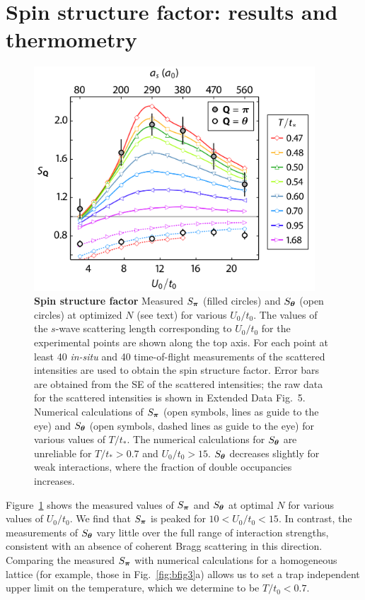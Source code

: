\BraggFigureNum 

\section{Spin structure factor: results and thermometry}
 
\begin{figure}
\centering \includegraphics[width=105mm]{../figures/afmpaper/Hulet_fig4.png}
\caption{\textbf{Spin structure factor}  Measured $S_{\bm{\pi}}$ (filled
circles) and $S_{\bm{\theta}}$ (open circles) at optimized $N$ (see text) for
various $U_{0}/t_{0}$. The values of the $s$-wave scattering length
corresponding to $U_{0}/t_{0}$ for the experimental points are shown along the
top axis.  For each point at least 40 \textit{in-situ} and 40 time-of-flight
measurements of the scattered intensities are used to obtain the spin structure
factor.  Error bars are obtained from the SE of the scattered intensities; the
raw data for the scattered intensities is shown in Extended Data Fig.~5.
Numerical calculations of $S_{\bm{\pi}}$ (open symbols, lines as guide to the
eye) and $S_{\bm{\theta}}$ (open symbols, dashed lines as guide to the eye) for
various values of $T/t_{*}$. The numerical calculations for $S_{\bm{\theta}}$
are unreliable for $T/t_{*}>0.7$ and $U_{0}/t_{0}>15$.  $S_{\bm{\theta}}$
decreases slightly for weak interactions, where the fraction of double
occupancies increases.  }
\label{fig:bfig4} 
\end{figure}

Figure~\ref{fig:bfig4} shows the measured values of $S_{\bm{\pi}}$ and
$S_{\bm{\theta}}$ at optimal $N$ for various values of $U_{0}/t_{0}$.  We find
that $S_{\bm{\pi}}$ is peaked for $10 < U_{0}/t_{0} < 15$.  In contrast, the
measurements of $S_{\bm{\theta}}$ vary little over the full range of
interaction strengths, consistent with an absence of coherent Bragg scattering
in this direction.  Comparing the measured $S_{\bm{\pi}}$ with numerical
calculations for a homogeneous lattice (for example, those in
Fig.~\ref{fig:bfig3}a) allows us to set a trap independent upper limit on the
temperature, which we determine to be $T/t_{0}<0.7$.  

